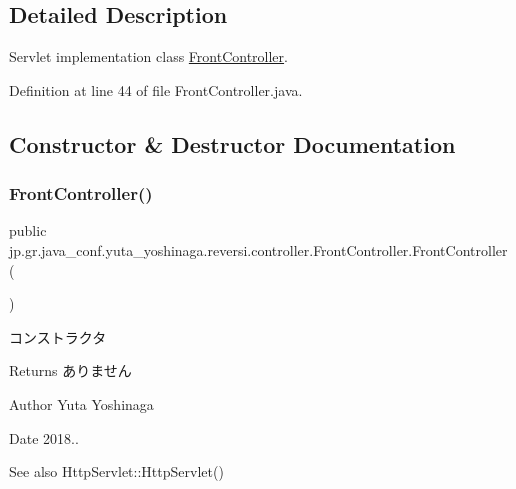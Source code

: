\subsection{Detailed Description}
Servlet implementation class \hyperlink{classjp_1_1gr_1_1java__conf_1_1yuta__yoshinaga_1_1reversi_1_1controller_1_1_front_controller}{Front\+Controller}. 

Definition at line 44 of file Front\+Controller.\+java.



\subsection{Constructor \& Destructor Documentation}
\mbox{\label{classjp_1_1gr_1_1java__conf_1_1yuta__yoshinaga_1_1reversi_1_1controller_1_1_front_controller_a918d736b7b4d8672076c15f8ca05075c}} 
\subsubsection{\texorpdfstring{Front\+Controller()}{FrontController()}}
{\footnotesize\ttfamily public jp.\+gr.\+java\+\_\+conf.\+yuta\+\_\+yoshinaga.\+reversi.\+controller.\+Front\+Controller.\+Front\+Controller (\begin{DoxyParamCaption}{ }\end{DoxyParamCaption})}



コンストラクタ 

\begin{DoxyReturn}{Returns}
ありません 
\end{DoxyReturn}
\begin{DoxyAuthor}{Author}
Yuta Yoshinaga 
\end{DoxyAuthor}
\begin{DoxyDate}{Date}
2018.. 
\end{DoxyDate}
\begin{DoxySeeAlso}{See also}
Http\+Servlet\+::\+Http\+Servlet() 
\end{DoxySeeAlso}


